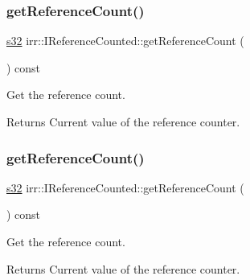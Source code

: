 \subsubsection{\texorpdfstring{get\+Reference\+Count()}{getReferenceCount()}\hspace{0.1cm}{\footnotesize\ttfamily [1/2]}}
{\footnotesize\ttfamily \hyperlink{namespaceirr_ac66849b7a6ed16e30ebede579f9b47c6}{s32} irr\+::\+I\+Reference\+Counted\+::get\+Reference\+Count (\begin{DoxyParamCaption}{ }\end{DoxyParamCaption}) const\hspace{0.3cm}{\ttfamily [inline]}}



Get the reference count. 

\begin{DoxyReturn}{Returns}
Current value of the reference counter. 
\end{DoxyReturn}
\mbox{\label{classirr_1_1IReferenceCounted_ae9836f102c33c68068e74292e0a01819}} 
\subsubsection{\texorpdfstring{get\+Reference\+Count()}{getReferenceCount()}\hspace{0.1cm}{\footnotesize\ttfamily [2/2]}}
{\footnotesize\ttfamily \hyperlink{namespaceirr_ac66849b7a6ed16e30ebede579f9b47c6}{s32} irr\+::\+I\+Reference\+Counted\+::get\+Reference\+Count (\begin{DoxyParamCaption}{ }\end{DoxyParamCaption}) const\hspace{0.3cm}{\ttfamily [inline]}}



Get the reference count. 

\begin{DoxyReturn}{Returns}
Current value of the reference counter. 
\end{DoxyReturn}
\mbox{\label{classirr_1_1IReferenceCounted_a396f9cdbe311ada278626477b3c6f0f5}} 
